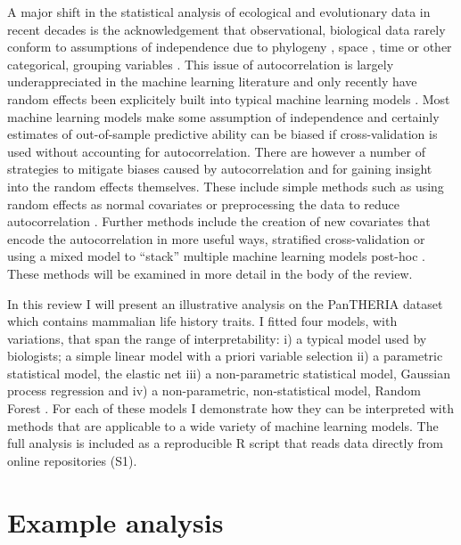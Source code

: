 \documentclass[10pt,]{article}
\begin{document}
A major shift in the statistical analysis of ecological and evolutionary data in recent decades is the acknowledgement that observational, biological data rarely conform to assumptions of independence due to phylogeny \citep{felsenstein1985phylogenies, ives2006statistics}, space \citep{redding2017evaluating, diggle1998model}, time \citep{ives2006statistics} or other categorical, grouping variables \citep{harrison2018brief, bolker2009generalized}. This issue of autocorrelation is largely underappreciated in the machine learning literature and only recently have random effects been explicitely built into typical machine learning models \citep{eo2014tree, hajjem2014mixed, hajjem2017generalized, miller2017gradient}. Most machine learning models make some assumption of independence and certainly estimates of out-of-sample predictive ability can be biased if cross-validation is used without accounting for autocorrelation. There are however a number of strategies to mitigate biases caused by autocorrelation and for gaining insight into the random effects themselves. These include simple methods such as using random effects as normal covariates or preprocessing the data to reduce autocorrelation \citep{elith2010art}. Further methods include the creation of new covariates that encode the autocorrelation in more useful ways, stratified cross-validation \citep{le2014spatial} or using a mixed model to ``stack'' multiple machine learning models post-hoc \citep{bhatt2017improved}. These methods will be examined in more detail in the body of the review.

In this review I will present an illustrative analysis on the PanTHERIA dataset \citep{jones2009pantheria} which contains mammalian life history traits. I fitted four models, with variations, that span the range of interpretability: i) a typical model used by biologists; a simple linear model with a priori variable selection ii) a parametric statistical model, the elastic net \citep{elasticnet} iii) a non-parametric statistical model, Gaussian process regression \citep{rasmussen2004gaussian} and iv) a non-parametric, non-statistical model, Random Forest \citep{breiman2001random}. For each of these models I demonstrate how they can be interpreted with methods that are applicable to a wide variety of machine learning models. The full analysis is included as a reproducible R \citep{R} script that reads data directly from online repositories (S1).

\section{Example analysis}\label{example-analysis}
\end{document}
